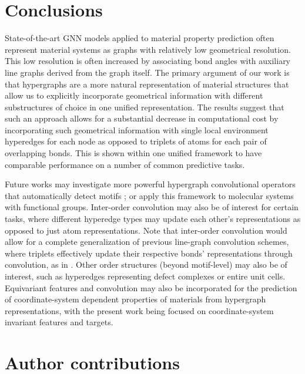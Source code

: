 \documentclass[twoside,twocolumn,9pt]{article}
\begin{document}
\section{Conclusions}
State-of-the-art GNN models applied to material property prediction often represent material systems as graphs with relatively low geometrical resolution. This low resolution is often increased by associating bond angles with auxiliary line graphs derived from the graph itself. The primary argument of our work is that hypergraphs are a more natural representation of material structures that allow us to explicitly incorporate geometrical information with different substructures of choice in one unified representation. The results suggest that such an approach allows for a substantial decrease in computational cost by incorporating such geometrical information with single local environment hyperedges for each node as opposed to triplets of atoms for each pair of overlapping bonds. This is shown within one unified framework to have comparable performance on a number of common predictive tasks.

Future works may investigate more powerful hypergraph convolutional operators that automatically detect motifs \cite{contrastivelearn_motif, motifexplore, motife3nn}; or apply this framework to molecular systems \cite{ molecule2, molecule3} with functional groups. Inter-order convolution may also be of interest for certain tasks, where different hyperedge types may update each other's representations as opposed to just atom representations. Note that inter-order convolution would allow for a complete generalization of previous line-graph convolution schemes, where triplets effectively update their respective bonds' representations through convolution, as in \cite{alignn, congn}. Other order structures (beyond motif-level) may also be of interest, such as hyperedges representing defect complexes or entire unit cells. Equivariant features and convolution \cite{e3nn, tfn, o3transformer1} may also be incorporated for the prediction of coordinate-system dependent properties of materials from hypergraph representations, with the present work being focused on coordinate-system invariant features and targets. 


\section*{Author contributions}
\end{document}
